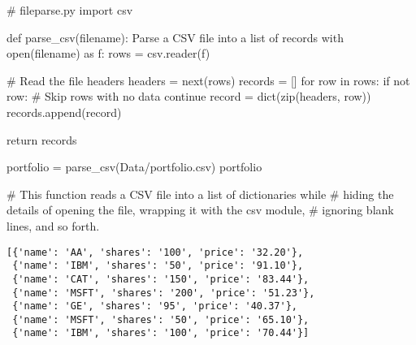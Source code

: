 \documentclass[
  letterpaper,
  DIV=11,
  numbers=noendperiod]{scrreprt}
\newenvironment{Shaded}{\begin{snugshade}}{\end{snugshade}}
\newcommand{\BuiltInTok}[1]{\textcolor[rgb]{0.00,0.46,0.62}{#1}}
\newcommand{\CommentTok}[1]{\textcolor[rgb]{0.37,0.37,0.37}{#1}}
\newcommand{\ControlFlowTok}[1]{\textcolor[rgb]{0.00,0.46,0.62}{#1}}
\newcommand{\ImportTok}[1]{\textcolor[rgb]{0.00,0.46,0.62}{#1}}
\newcommand{\KeywordTok}[1]{\textcolor[rgb]{0.00,0.46,0.62}{#1}}
\newcommand{\NormalTok}[1]{\textcolor[rgb]{0.00,0.46,0.62}{#1}}
\newcommand{\OperatorTok}[1]{\textcolor[rgb]{0.37,0.37,0.37}{#1}}
\newcommand{\StringTok}[1]{\textcolor[rgb]{0.13,0.47,0.30}{#1}}
\begin{document}
\begin{Shaded}
\begin{Highlighting}[]
\CommentTok{\# fileparse.py}
\ImportTok{import}\NormalTok{ csv}

\KeywordTok{def}\NormalTok{ parse\_csv(filename):}
    \CommentTok{\textquotesingle{}\textquotesingle{}\textquotesingle{}}
\CommentTok{    Parse a CSV file into a list of records}
\CommentTok{    \textquotesingle{}\textquotesingle{}\textquotesingle{}}
    \ControlFlowTok{with} \BuiltInTok{open}\NormalTok{(filename) }\ImportTok{as}\NormalTok{ f:}
\NormalTok{        rows }\OperatorTok{=}\NormalTok{ csv.reader(f)}

        \CommentTok{\# Read the file headers}
\NormalTok{        headers }\OperatorTok{=} \BuiltInTok{next}\NormalTok{(rows)}
\NormalTok{        records }\OperatorTok{=}\NormalTok{ []}
        \ControlFlowTok{for}\NormalTok{ row }\KeywordTok{in}\NormalTok{ rows:}
            \ControlFlowTok{if} \KeywordTok{not}\NormalTok{ row:    }\CommentTok{\# Skip rows with no data}
                \ControlFlowTok{continue}
\NormalTok{            record }\OperatorTok{=} \BuiltInTok{dict}\NormalTok{(}\BuiltInTok{zip}\NormalTok{(headers, row))}
\NormalTok{            records.append(record)}

    \ControlFlowTok{return}\NormalTok{ records}
\end{Highlighting}
\end{Shaded}

\begin{Shaded}
\begin{Highlighting}[]
\NormalTok{portfolio }\OperatorTok{=}\NormalTok{ parse\_csv(}\StringTok{\textquotesingle{}Data/portfolio.csv\textquotesingle{}}\NormalTok{)}
\NormalTok{portfolio}

\CommentTok{\# This function reads a CSV file into a list of dictionaries while}
\CommentTok{\# hiding the details of opening the file, wrapping it with the csv module,}
\CommentTok{\# ignoring blank lines, and so forth.}
\end{Highlighting}
\end{Shaded}

\begin{verbatim}
[{'name': 'AA', 'shares': '100', 'price': '32.20'},
 {'name': 'IBM', 'shares': '50', 'price': '91.10'},
 {'name': 'CAT', 'shares': '150', 'price': '83.44'},
 {'name': 'MSFT', 'shares': '200', 'price': '51.23'},
 {'name': 'GE', 'shares': '95', 'price': '40.37'},
 {'name': 'MSFT', 'shares': '50', 'price': '65.10'},
 {'name': 'IBM', 'shares': '100', 'price': '70.44'}]
\end{verbatim}
\end{document}
